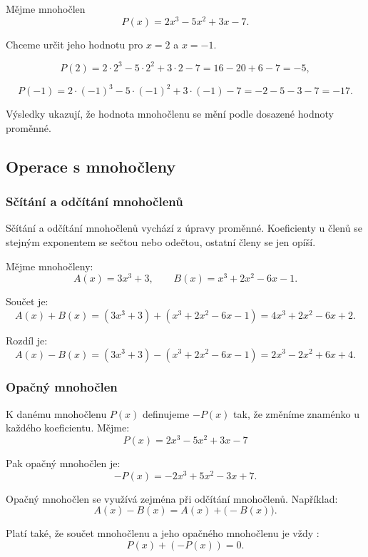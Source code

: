 \documentclass[12pt,a4paper]{article}
\begin{document}
\begin{examplebox}
Mějme mnohočlen
\[
P(x) = 2x^3 - 5x^2 + 3x - 7.
\]

Chceme určit jeho hodnotu pro $x=2$ a $x=-1$.

\[
P(2) = 2\cdot 2^3 - 5\cdot 2^2 + 3\cdot 2 - 7 = 16 - 20 + 6 - 7 = -5,
\]

\[
P(-1) = 2\cdot (-1)^3 - 5\cdot (-1)^2 + 3\cdot (-1) - 7 = -2 - 5 - 3 - 7 = -17.
\]

Výsledky ukazují, že hodnota mnohočlenu se mění podle dosazené hodnoty proměnné.
\end{examplebox}

\newpage
\subsection{Operace s mnohočleny}
\subsubsection*{Sčítání a odčítání mnohočlenů}

Sčítání a odčítání mnohočlenů vychází z úpravy  proměnné.  
Koeficienty u členů se stejným exponentem se sečtou nebo odečtou, ostatní členy se jen opíší.

\begin{examplebox}
Mějme mnohočleny:
\[
A(x) = 3x^3 + 3, \qquad B(x) = x^3 + 2x^2 - 6x - 1.
\]

Součet je:
\[
A(x) + B(x) = (3x^3 + 3) + (x^3 + 2x^2 - 6x - 1) = 4x^3 + 2x^2 - 6x + 2.
\]

Rozdíl je:
\[
A(x) - B(x) = (3x^3 + 3) - (x^3 + 2x^2 - 6x - 1) = 2x^3 - 2x^2 + 6x + 4.
\]
\end{examplebox}

\subsubsection*{Opačný mnohočlen}

K danému mnohočlenu $P(x)$ definujeme  $-P(x)$ tak,
 že změníme znaménko u každého koeficientu.
Mějme:
\[
P(x) = 2x^3 - 5x^2 + 3x - 7
\]
  
Pak opačný mnohočlen je:
\[
-P(x) = -2x^3 + 5x^2 - 3x + 7.
\]

Opačný mnohočlen se využívá zejména při odčítání mnohočlenů. Například:
\[
A(x) - B(x) = A(x) + \big(-B(x)\big).
\]

Platí také, že součet mnohočlenu a jeho opačného mnohočlenu je vždy :
\[
P(x) + (-P(x)) = 0.
\]
\end{document}
